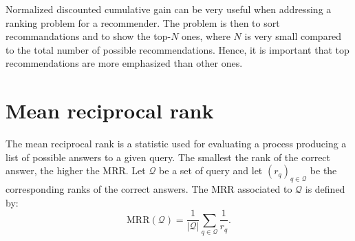 \documentclass[a4paper]{article}
\begin{document}
Normalized discounted cumulative gain can be very useful when addressing a ranking problem for a recommender.
The problem is then to sort recommandations and to show the top-$N$ ones, where $N$ is very small compared 
to the total number of possible recommendations. Hence, it is important that top recommendations are more 
emphasized than other ones.

\section{Mean reciprocal rank}
The mean reciprocal rank is a statistic used for evaluating a process producing a 
list of possible answers to a given query. The smallest the rank of the correct 
answer, the higher the MRR.
Let $\mathcal{Q}$ be a set of query and let $\left( r_q \right)_{q \in \mathcal{Q}}$ 
be the corresponding ranks of the correct answers. The MRR associated to $\mathcal{Q}$ 
is defined by:
\[
  \mathrm{MRR}(\mathcal{Q}) = \frac{1}{|\mathcal{Q}|} \sum_{q \in \mathcal{Q}} \frac{1}{r_q}.
\]
\end{document}
